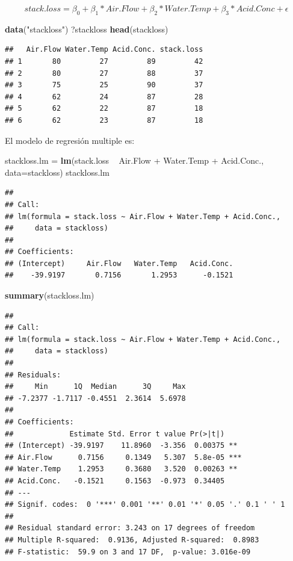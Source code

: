 \documentclass[]{article}
\newenvironment{Shaded}{\begin{snugshade}}{\end{snugshade}}
\newcommand{\KeywordTok}[1]{\textcolor[rgb]{0.13,0.29,0.53}{\textbf{{#1}}}}
\newcommand{\DataTypeTok}[1]{\textcolor[rgb]{0.13,0.29,0.53}{{#1}}}
\newcommand{\StringTok}[1]{\textcolor[rgb]{0.31,0.60,0.02}{{#1}}}
\newcommand{\NormalTok}[1]{{#1}}
\numberwithin{equation}{section}
\begin{document}
\[
      stack.loss = \beta_0 + \beta_1 * Air.Flow + \beta_2 * Water.Temp + \beta_3 * Acid.Conc + \epsilon
\]

\begin{Shaded}
\begin{Highlighting}[]
\KeywordTok{data}\NormalTok{(}\StringTok{"stackloss"}\NormalTok{)}
\NormalTok{?stackloss}
\KeywordTok{head}\NormalTok{(stackloss)}
\end{Highlighting}
\end{Shaded}

\begin{verbatim}
##   Air.Flow Water.Temp Acid.Conc. stack.loss
## 1       80         27         89         42
## 2       80         27         88         37
## 3       75         25         90         37
## 4       62         24         87         28
## 5       62         22         87         18
## 6       62         23         87         18
\end{verbatim}

El modelo de regresión multiple es:

\begin{Shaded}
\begin{Highlighting}[]
\NormalTok{stackloss.lm =}\StringTok{ }\KeywordTok{lm}\NormalTok{(stack.loss ~}\StringTok{ }\NormalTok{Air.Flow +}\StringTok{ }\NormalTok{Water.Temp +}\StringTok{ }\NormalTok{Acid.Conc., }\DataTypeTok{data=}\NormalTok{stackloss) }
\NormalTok{stackloss.lm}
\end{Highlighting}
\end{Shaded}

\begin{verbatim}
## 
## Call:
## lm(formula = stack.loss ~ Air.Flow + Water.Temp + Acid.Conc., 
##     data = stackloss)
## 
## Coefficients:
## (Intercept)     Air.Flow   Water.Temp   Acid.Conc.  
##    -39.9197       0.7156       1.2953      -0.1521
\end{verbatim}

\begin{Shaded}
\begin{Highlighting}[]
\KeywordTok{summary}\NormalTok{(stackloss.lm)}
\end{Highlighting}
\end{Shaded}

\begin{verbatim}
## 
## Call:
## lm(formula = stack.loss ~ Air.Flow + Water.Temp + Acid.Conc., 
##     data = stackloss)
## 
## Residuals:
##     Min      1Q  Median      3Q     Max 
## -7.2377 -1.7117 -0.4551  2.3614  5.6978 
## 
## Coefficients:
##             Estimate Std. Error t value Pr(>|t|)    
## (Intercept) -39.9197    11.8960  -3.356  0.00375 ** 
## Air.Flow      0.7156     0.1349   5.307  5.8e-05 ***
## Water.Temp    1.2953     0.3680   3.520  0.00263 ** 
## Acid.Conc.   -0.1521     0.1563  -0.973  0.34405    
## ---
## Signif. codes:  0 '***' 0.001 '**' 0.01 '*' 0.05 '.' 0.1 ' ' 1
## 
## Residual standard error: 3.243 on 17 degrees of freedom
## Multiple R-squared:  0.9136, Adjusted R-squared:  0.8983 
## F-statistic:  59.9 on 3 and 17 DF,  p-value: 3.016e-09
\end{verbatim}
\end{document}
